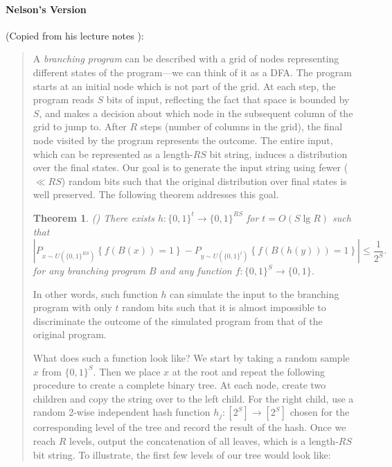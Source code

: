 \documentclass[11pt]{article}
\theoremstyle{plain}
\newtheorem{theorem}{Theorem}[section]
\begin{document}
\paragraph{Nelson's Version}(Copied from his lecture 
notes  \cite{Nel2015-web}):

\begin{quotation}
A {\em branching program} can be described with a grid of nodes 
representing different states of the program---we can think of it as a DFA. 
The program starts at an initial node which is not part of the grid. At each 
step, the program reads $S$ bits of input, reflecting the fact that space is 
bounded by $S$, and makes a decision about which node in the subsequent 
column of the grid to jump to. After $R$ steps (number of columns in the 
grid), the final node visited by the program represents the outcome. The 
entire input, which can be represented as a length-$RS$ bit string, induces a 
distribution over the final states. Our goal is to generate the input string 
using fewer ($\ll RS$) random bits such that the original distribution over 
final states is well preserved. The following theorem addresses this goal.

\begin{theorem} (\cite{Nisan1990-prg}) \label{thm:nisan}
	There exists $h:\{0,1\}^{t}\rightarrow\{0,1\}^{RS}$ for $t=O(S\lg R)$ such 
	that 
	\begin{equation*}
	\left| P_{x\sim U(\{0,1\}^{RS})}\left\{ f(B(x))=1 \right\} -P_{y\sim 
		U(\{0,1\}^{t})}\left\{ f(B(h(y)))=1 \right\} \right| \le \frac{1}{2^{S}}.
	\end{equation*}
	for any branching program $B$ and any function 
	$f:\{0,1\}^{S}\rightarrow\{0,1\}$. 
\end{theorem}

In other words, such function $h$ can simulate the input to the branching 
program with only $t$ random bits such that it is almost impossible to 
discriminate the outcome of the simulated program from that of the original 
program.

What does such a function look like? We start by taking a random sample 
$x$ from $\{0,1\}^S$. Then we place $x$ at the root and repeat the following 
procedure to create a complete binary tree. At each node, create two children 
and copy the string over to the left child. For the right child, use a random 
2-wise independent hash function $h_j:[2^S]\rightarrow[2^S]$ chosen for the 
corresponding level of the tree and record the result of the hash. Once we 
reach $R$ levels, output the concatenation of all leaves, which is a 
length-$RS$ bit string. To illustrate, the first few levels of our tree would look 
like:


\end{quotation}
\end{document}
